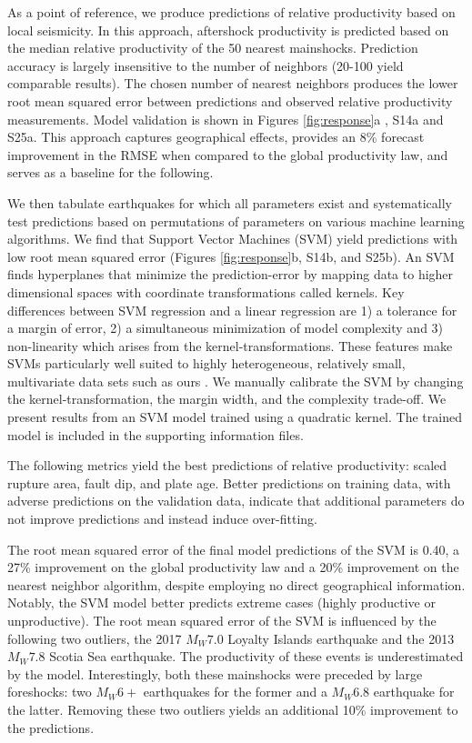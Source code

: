 \documentclass[draft, jgrga]{agujournal2018}
\begin{document}
    As a point of reference, we produce predictions of relative productivity based on local seismicity. In this approach, aftershock productivity is predicted based on the median relative productivity of the 50 nearest mainshocks. Prediction accuracy is largely insensitive to the number of neighbors (20-100 yield comparable results). The chosen number of nearest neighbors produces the lower root mean squared error between predictions and observed relative productivity measurements. Model validation is shown in Figures \ref{fig:response}a , S14a and S25a. This approach captures geographical effects, provides an 8\% forecast improvement in the RMSE when compared to the global productivity law, and serves as a baseline for the following.

    We then tabulate earthquakes for which all parameters exist and systematically test predictions based on permutations of parameters on various machine learning algorithms. We find that Support Vector Machines (SVM) yield predictions with low root mean squared error (Figures \ref{fig:response}b, S14b, and S25b). An SVM finds hyperplanes that minimize the prediction-error by mapping data to higher dimensional spaces with coordinate transformations called kernels. Key differences between SVM regression and a linear regression are 1) a tolerance for a margin of error, 2) a simultaneous minimization of model complexity and 3) non-linearity which arises from the kernel-transformations. These features make SVMs particularly well suited to highly heterogeneous, relatively small, multivariate data sets such as ours \citep{witten2011}. We manually calibrate the SVM by changing the kernel-transformation, the margin width, and the complexity trade-off. We present results from an SVM model trained using a quadratic kernel. The trained model is included in the supporting information files.

    The following metrics yield the best predictions of relative productivity: scaled rupture area, fault dip, and plate age. Better predictions on training data, with adverse predictions on the validation data, indicate that additional parameters do not improve predictions and instead induce over-fitting.

    The root mean squared error of the final model predictions of the SVM is 0.40, a 27\% improvement on the global productivity law and a 20\% improvement on the nearest neighbor algorithm, despite employing no direct geographical information. Notably, the SVM model better predicts extreme cases (highly productive or unproductive). The root mean squared error of the SVM is influenced by the following two outliers, the 2017 $M_W7.0$ Loyalty Islands earthquake and the 2013 $M_W7.8$ Scotia Sea earthquake. The productivity of these events is underestimated by the model. Interestingly, both these mainshocks were preceded by large foreshocks: two $M_W6+$ earthquakes for the former and a $M_W6.8$ earthquake for the latter. Removing these two outliers yields an additional 10\% improvement to the predictions.
\end{document}
